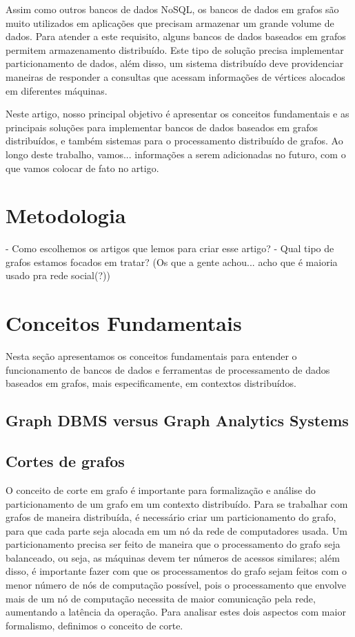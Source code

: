 \documentclass[conference]{IEEEtran}
\begin{document}
Assim como outros bancos de dados NoSQL, os bancos de dados em grafos
são muito utilizados em aplicações que precisam armazenar um grande 
volume de dados. Para atender a este requisito, alguns bancos de dados
baseados em grafos permitem armazenamento distribuído. Este tipo de 
solução precisa implementar particionamento de dados, além disso, um 
sistema distribuído deve providenciar maneiras de responder a consultas 
que acessam informações de vértices alocados em diferentes máquinas. 

Neste artigo, nosso principal objetivo é apresentar os conceitos 
fundamentais e as principais soluções para implementar bancos de dados
baseados em grafos distribuídos, e também sistemas para o processamento
distribuído de grafos. Ao longo deste trabalho, vamos... {\color{blue} 
informações a serem adicionadas no futuro, com o que vamos colocar de
fato no artigo}.

\section{Metodologia}
- Como escolhemos os artigos que lemos para criar esse artigo?
- Qual tipo de grafos estamos focados em tratar? (Os que a gente achou...
acho que é maioria usado pra rede social(?))

\section{Conceitos Fundamentais}
Nesta seção apresentamos os conceitos fundamentais para entender o 
funcionamento de bancos de dados e ferramentas de processamento de dados
baseados em grafos, mais especificamente, em contextos distribuídos.

\subsection{Graph DBMS versus Graph Analytics Systems}

\subsection{Cortes de grafos}
O conceito de corte em grafo é importante para formalização e análise
do particionamento de um grafo em um contexto distribuído. Para se 
trabalhar com grafos de maneira distribuída, é necessário criar um 
particionamento do grafo, para que cada parte seja alocada em um nó da 
rede de computadores usada. Um particionamento precisa ser feito de 
maneira que o processamento do grafo seja balanceado, ou seja, as 
máquinas devem ter números de acessos similares; além disso, é 
importante fazer com que os processamentos do grafo sejam feitos com o 
menor número de nós de computação possível, pois o processamento que 
envolve mais de um nó de computação necessita de maior comunicação pela 
rede, aumentando a latência da operação. Para analisar estes dois
aspectos com maior formalismo, definimos o conceito de corte.
\end{document}

